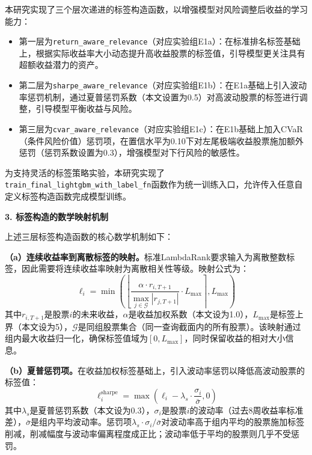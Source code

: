 \documentclass[11pt,a4paper]{ctexart}
\begin{document}
本研究实现了三个层次递进的标签构造函数，以增强模型对风险调整后收益的学习能力：

\begin{itemize}
\item 第一层为\texttt{return\_aware\_relevance}（对应实验组E1a）：在标准排名标签基础上，根据实际收益率大小动态提升高收益股票的标签值，引导模型更关注具有超额收益潜力的资产。
\item 第二层为\texttt{sharpe\_aware\_relevance}（对应实验组E1b）：在E1a基础上引入波动率惩罚机制，通过夏普惩罚系数（本文设置为0.5）对高波动股票的标签进行调整，引导模型平衡收益与风险。
\item 第三层为\texttt{cvar\_aware\_relevance}（对应实验组E1c）：在E1b基础上加入CVaR（条件风险价值）惩罚项，在置信水平为0.10下对左尾极端收益股票施加额外惩罚（惩罚系数设置为0.3），增强模型对下行风险的敏感性。
\end{itemize}

为支持灵活的标签策略实验，本研究实现了\texttt{train\_final\_lightgbm\_with\_label\_fn}函数作为统一训练入口，允许传入任意自定义标签构造函数完成模型训练。

\textbf{3. 标签构造的数学映射机制}

上述三层标签构造函数的核心数学机制如下：

\textbf{（a）连续收益率到离散标签的映射。}标准LambdaRank要求输入为离散整数标签，因此需要将连续收益率映射为离散相关性等级。映射公式为：
\begin{equation}
\ell_i = \min\left(\left\lfloor \frac{\alpha \cdot r_{i,T+1}}{\max_{j \in \mathcal{G}} |r_{j,T+1}|} \cdot L_{\max}\right\rceil, L_{\max}\right)
\label{eq:label_mapping}
\end{equation}
其中$r_{i,T+1}$是股票$i$的未来收益，$\alpha$是收益加权系数（本文设为1.0），$L_{\max}$是标签上界（本文设为5），$\mathcal{G}$是同组股票集合（同一查询截面内的所有股票）。该映射通过组内最大收益归一化，确保标签值域为$[0, L_{\max}]$，同时保留收益的相对大小信息。

\textbf{（b）夏普惩罚项。}在收益加权标签基础上，引入波动率惩罚以降低高波动股票的标签值：
\begin{equation}
\ell_i^{\text{sharpe}} = \max\left(\ell_i - \lambda_s \cdot \frac{\sigma_i}{\bar{\sigma}}, 0\right)
\label{eq:sharpe_penalty}
\end{equation}
其中$\lambda_s$是夏普惩罚系数（本文设为0.3），$\sigma_i$是股票$i$的波动率（过去8周收益率标准差），$\bar{\sigma}$是组内平均波动率。惩罚项$\lambda_s \cdot \sigma_i / \bar{\sigma}$对波动率高于组内平均的股票施加标签削减，削减幅度与波动率偏离程度成正比；波动率低于平均的股票则几乎不受惩罚。
\end{document}
